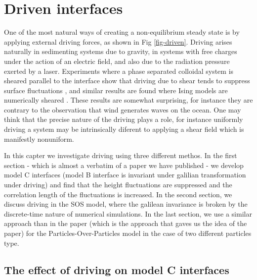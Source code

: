 \chapter{Driven interfaces}
\label{chap-driven}

One of the most natural ways of creating a non-equilibrium steady state is by applying
external driving forces, as shown in Fig \ref{fig-driven}. Driving arises naturally in sedimenting systems due to gravity, in systems with free charges under the action of an electric field, and also due to the radiation pressure exerted by a laser. Experiments where a phase separated colloidal system is sheared parallel to the interface show that driving due to shear tends to suppress surface fluctuations \cite{derks_suppression_2006}, and similar results are found where Ising models are numerically sheared \cite{smith_interfaces_2008,smith_lateral_2010}. These results are somewhat surprising, for instance they
are contrary to the observation that wind generates waves on the ocean. One may think that the precise nature of the driving plays a role, for instance uniformly driving a system may be intrinsically diferent to applying a shear field which is manifestly nonuniform. 

In this capter we investigate driving using three different methos. 
In the first section - which is almost a verbatim of a paper we have published \cite{dean_effect_2020} -  we develop model C interfaces (model B interface is invariant under galilian transformation under driving) and find that the height fluctuations are suppressed and the correlation length of the fluctuations is increased. 
In the second section, we discuss driving in the SOS model, where the galilean invariance is broken by the discrete-time nature of numerical simulations.
In the last section, we use a similar approach than in the paper (which is the approach that gaves us the idea of the paper) for the Particles-Over-Particles model in the case of two different particles type.

    \section{The effect of driving on model C interfaces}

